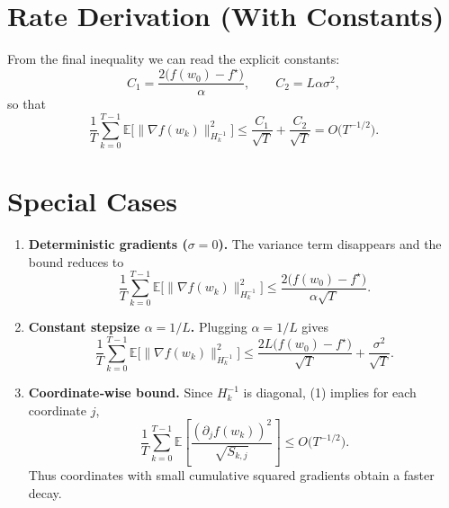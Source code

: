 \documentclass{article}
\begin{document}
\section*{Rate Derivation (With Constants)}
From the final inequality we can read the explicit constants:
\[
C_{1}= \frac{2\bigl(f(w_{0})-f^{\star}\bigr)}{\alpha},
\qquad
C_{2}=L\alpha\sigma^{2},
\]
so that
\[
\frac{1}{T}\sum_{k=0}^{T-1}
\mathbb{E}\!\bigl[\|\nabla f(w_{k})\|^{2}_{H_{k}^{-1}}\bigr]
\le \frac{C_{1}}{\sqrt{T}}+ \frac{C_{2}}{\sqrt{T}}
= O\!\bigl(T^{-1/2}\bigr).
\]

\section*{Special Cases}
\begin{enumerate}[label=(\alph*)]
\item \textbf{Deterministic gradients ($\sigma=0$).} The variance term disappears and the bound reduces to
\[
\frac{1}{T}\sum_{k=0}^{T-1}
\mathbb{E}\!\bigl[\|\nabla f(w_{k})\|^{2}_{H_{k}^{-1}}\bigr]
\le \frac{2\bigl(f(w_{0})-f^{\star}\bigr)}{\alpha\sqrt{T}} .
\]

\item \textbf{Constant stepsize $\alpha=1/L$.} Plugging $\alpha=1/L$ gives
\[
\frac{1}{T}\sum_{k=0}^{T-1}
\mathbb{E}\!\bigl[\|\nabla f(w_{k})\|^{2}_{H_{k}^{-1}}\bigr]
\le
\frac{2L\bigl(f(w_{0})-f^{\star}\bigr)}{\sqrt{T}}
   +\frac{\sigma^{2}}{\sqrt{T}} .
\]

\item \textbf{Coordinate‑wise bound.} Since $H_{k}^{-1}$ is diagonal, (1) implies for each coordinate $j$,
\[
\frac{1}{T}\sum_{k=0}^{T-1}
\mathbb{E}\!\left[\frac{(\partial_{j}f(w_{k}))^{2}}{\sqrt{S_{k,j}}}\right]
\le O\!\bigl(T^{-1/2}\bigr).
\]
Thus coordinates with small cumulative squared gradients obtain a faster decay.
\end{enumerate}
\end{document}
